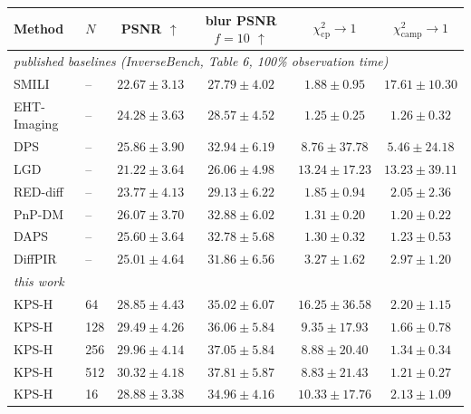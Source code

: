 \footnotesize
\setlength{\tabcolsep}{3.5pt}
\begin{tabular}{llcccc}
\toprule
Method & $N$ & PSNR $\uparrow$ & \shortstack{blur PSNR\\$f{=}10$ $\uparrow$} & $\chi^2_{\text{cp}}\to 1$ & $\chi^2_{\text{camp}}\to 1$ \\
\midrule
\multicolumn{6}{l}{\emph{published baselines (InverseBench, Table 6, 100\% observation time)}} \\
SMILI & -- & $22.67 \pm 3.13$ & $27.79 \pm 4.02$ & $1.88 \pm 0.95$ & $17.61 \pm 10.30$ \\
EHT-Imaging & -- & $24.28 \pm 3.63$ & $28.57 \pm 4.52$ & $1.25 \pm 0.25$ & $1.26 \pm 0.32$ \\
DPS & -- & $25.86 \pm 3.90$ & $32.94 \pm 6.19$ & $8.76 \pm 37.78$ & $5.46 \pm 24.18$ \\
LGD & -- & $21.22 \pm 3.64$ & $26.06 \pm 4.98$ & $13.24 \pm 17.23$ & $13.23 \pm 39.11$ \\
RED-diff & -- & $23.77 \pm 4.13$ & $29.13 \pm 6.22$ & $1.85 \pm 0.94$ & $2.05 \pm 2.36$ \\
PnP-DM & -- & $26.07 \pm 3.70$ & $32.88 \pm 6.02$ & $1.31 \pm 0.20$ & $1.20 \pm 0.22$ \\
DAPS & -- & $25.60 \pm 3.64$ & $32.78 \pm 5.68$ & $1.30 \pm 0.32$ & $1.23 \pm 0.53$ \\
DiffPIR & -- & $25.01 \pm 4.64$ & $31.86 \pm 6.56$ & $3.27 \pm 1.62$ & $2.97 \pm 1.20$ \\
\midrule
\multicolumn{6}{l}{\emph{this work}} \\
KPS-H & 64 & $28.85 \pm 4.43$ & $35.02 \pm 6.07$ & $16.25 \pm 36.58$ & $2.20 \pm 1.15$ \\
KPS-H & 128 & $29.49 \pm 4.26$ & $36.06 \pm 5.84$ & $9.35 \pm 17.93$ & $1.66 \pm 0.78$ \\
KPS-H & 256 & $29.96 \pm 4.14$ & $37.05 \pm 5.84$ & $8.88 \pm 20.40$ & $1.34 \pm 0.34$ \\
KPS-H & 512 & $30.32 \pm 4.18$ & $37.81 \pm 5.87$ & $8.83 \pm 21.43$ & $1.21 \pm 0.27$ \\
KPS-H & 16 & $28.88 \pm 3.38$ & $34.96 \pm 4.16$ & $10.33 \pm 17.76$ & $2.13 \pm 1.09$ \\
\bottomrule
\end{tabular}
